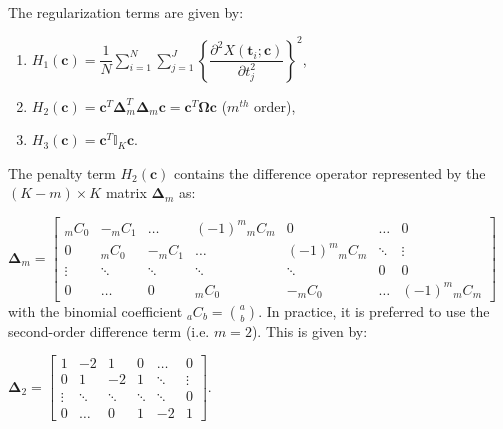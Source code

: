 \\
The regularization terms are given by: 
\begin{enumerate}
\renewcommand*\labelenumi{[\theenumi]}
\item $H_1(\bm{c}) = \dfrac{1}{N}\sum_{i=1}^{N}\sum_{j=1}^{J}\left\{\dfrac{\partial^2 X(\bm{t}_i ; \bm{c})}{\partial t_j^2} \right\}^2$,
\item $H_2(\bm{c}) = \bm{c}^T \bm{\Delta}^T_m \bm{\Delta}_m \bm{c} = \bm{c}^T \bm{\Omega} \bm{c}$ ($m^{th}$ order),
\item $H_3(\bm{c}) = \bm{c}^T \mathbb{I}_K \bm{c}$.
\end{enumerate}
The penalty term $H_2(\bm{c})$ contains the difference operator represented by the $(K-m) \times K$ matrix $\bm{\Delta}_m$ as:

$\bm{\Delta}_m=\begin{bmatrix}
{}_{m}C_{0} & -{}_{m}C_{1} & \dots & (-1)^m {}_{m}C_{m} & 0 & \dots & 0\\
0 & {}_{m}C_{0} & -{}_{m}C_{1} & \dots & (-1)^m {}_{m}C_{m} & \ddots & \vdots\\
\vdots & \ddots & \ddots & \ddots & \ddots & 0 & 0\\
0 & \dots & 0 & {}_{m}C_{0} & -{}_{m}C_{0} & \dots & (-1)^m {}_{m}C_{m}
\end{bmatrix}$\\ 

with the binomial coefficient ${}_{a}C_{b} = {a \choose b}$. In practice, it is preferred to use the second-order difference term (i.e. $m = 2$). This is given by:

$\bm{\Delta}_2=\begin{bmatrix}
1 & -2 & 1 & 0 & \dots & 0\\
0 & 1 & -2 & 1 & \ddots & \vdots\\
\vdots & \ddots & \ddots & \ddots & \ddots & 0\\
0 & \dots & 0 & 1 & -2 & 1
\end{bmatrix}$.\\

